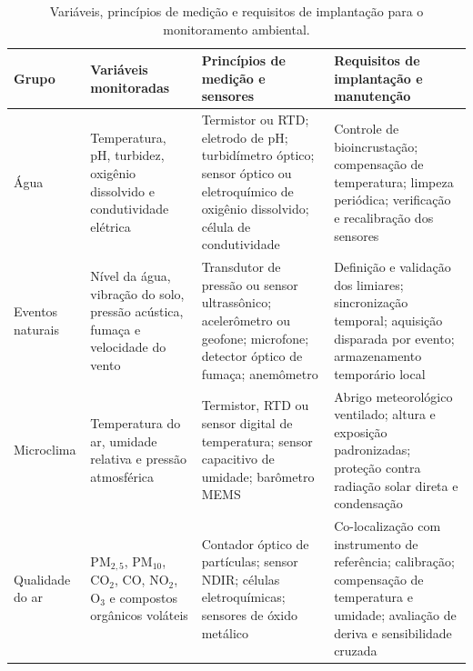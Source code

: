 \begin{table}[!t]
\centering
\caption{Variáveis, princípios de medição e requisitos de implantação para o monitoramento ambiental.}
\label{tab:sensores_ambientais}
\footnotesize
\setlength{\tabcolsep}{4pt}
\renewcommand{\arraystretch}{1.18}

\begin{tabularx}{\textwidth}{
    @{}
    L{2.0cm}
    L{3.6cm}
    Y
    Y
    @{}
}
\toprule
\textbf{Grupo} &
\textbf{Variáveis monitoradas} &
\textbf{Princípios de medição e sensores} &
\textbf{Requisitos de implantação e manutenção} \\
\midrule

Água
\cite{10.1145/3005719} &
Temperatura, pH, turbidez, oxigênio dissolvido e condutividade elétrica &
Termistor ou RTD; eletrodo de pH; turbidímetro óptico; sensor óptico ou eletroquímico de oxigênio dissolvido; célula de condutividade &
Controle de bioincrustação; compensação de temperatura; limpeza periódica; verificação e recalibração dos sensores \\

\addlinespace

Eventos naturais
\cite{10.1145/1134680.1134685} &
Nível da água, vibração do solo, pressão acústica, fumaça e velocidade do vento &
Transdutor de pressão ou sensor ultrassônico; acelerômetro ou geofone; microfone; detector óptico de fumaça; anemômetro &
Definição e validação dos limiares; sincronização temporal; aquisição disparada por evento; armazenamento temporário local \\

\addlinespace

Microclima
\cite{HART2006177,5597912,10.1145/570738.570751} &
Temperatura do ar, umidade relativa e pressão atmosférica &
Termistor, RTD ou sensor digital de temperatura; sensor capacitivo de umidade; barômetro MEMS &
Abrigo meteorológico ventilado; altura e exposição padronizadas; proteção contra radiação solar direta e condensação \\

\addlinespace

Qualidade do ar
\cite{atmos10090506,KANG2022151769} &
\(\mathrm{PM}_{2{,}5}\), \(\mathrm{PM}_{10}\), \(\mathrm{CO}_{2}\), \(\mathrm{CO}\), \(\mathrm{NO}_{2}\), \(\mathrm{O}_{3}\) e compostos orgânicos voláteis &
Contador óptico de partículas; sensor NDIR; células eletroquímicas; sensores de óxido metálico &
Co-localização com instrumento de referência; calibração; compensação de temperatura e umidade; avaliação de deriva e sensibilidade cruzada \\


\end{tabularx}
\end{table}
